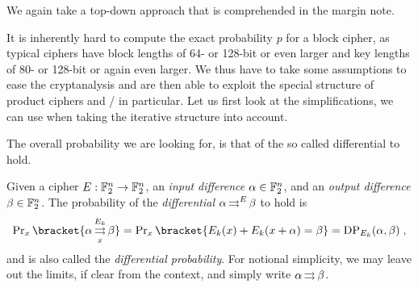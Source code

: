 We again take a top-down approach that is comprehended in the margin note.

It is inherently hard to compute the exact probability $p$ for a block cipher, as typical ciphers have block lengths of 64- or 128-bit or even larger and key lengths of 80- or 128-bit or again even larger.
We thus have to take some assumptions to ease the cryptanalysis and are then able to exploit the special structure of product ciphers and \SPNp/ in particular.
Let us first look at the simplifications, we can use when taking the iterative structure into account.

The overall probability we are looking for, is that of the so called differential to hold.
\begin{definition}[Differential]
    Given a cipher $E : \mathbb{F}_2^n \to \mathbb{F}_2^n$, an \emph{input difference} $\alpha \in \mathbb{F}_2^n$, and an \emph{output difference} $\beta \in \mathbb{F}_2^n$.
    The probability of the \emph{differential} $\alpha \operatorname*{\rightrightarrows}^{E}_{} \beta$ to hold is
    \begin{equation*}
        \Prob_x\bracket{\propDiff{\alpha}{E_k}{x}{\beta}} = \Prob_x\bracket{E_k(x) + E_k(x + \alpha) = \beta} = \mathrm{DP}_{E_k}(\alpha, \beta)\;,
    \end{equation*}
    and is also called the \emph{differential probability}.
    For notional simplicity, we may leave out the limits, if clear from the context, and simply write $\alpha \operatorname*{\rightrightarrows}^{}_{} \beta$.
\end{definition}

